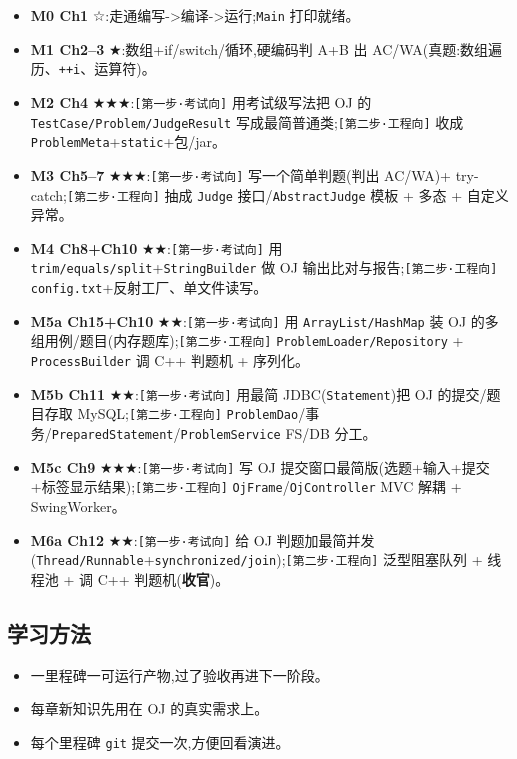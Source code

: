 \documentclass[
  11pt,
]{ctexart}
\providecommand{\tightlist}{%
  \setlength{\itemsep}{0pt}\setlength{\parskip}{0pt}}
\begin{document}
\begin{itemize}
\tightlist
\item
  \textbf{M0 Ch1}
  ☆:走通编写-\textgreater 编译-\textgreater 运行;\texttt{Main}
  打印就绪。
\item
  \textbf{M1 Ch2--3} ★:数组+if/switch/循环,硬编码判 A+B 出
  AC/WA(真题:数组遍历、\texttt{++i}、运算符)。
\item
  \textbf{M2 Ch4} ★★★:\texttt{{[}第一步·考试向{]}} 用考试级写法把 OJ 的
  \texttt{TestCase/Problem/JudgeResult}
  写成最简普通类;\texttt{{[}第二步·工程向{]}} 收成
  \texttt{ProblemMeta}+\texttt{static}+包/jar。
\item
  \textbf{M3 Ch5--7} ★★★:\texttt{{[}第一步·考试向{]}}
  写一个简单判题(判出 AC/WA)+ try-catch;\texttt{{[}第二步·工程向{]}}
  抽成 \texttt{Judge} 接口/\texttt{AbstractJudge} 模板 + 多态 +
  自定义异常。
\item
  \textbf{M4 Ch8+Ch10} ★★:\texttt{{[}第一步·考试向{]}} 用
  \texttt{trim/equals/split}+\texttt{StringBuilder} 做 OJ
  输出比对与报告;\texttt{{[}第二步·工程向{]}}
  \texttt{config.txt}+反射工厂、单文件读写。
\item
  \textbf{M5a Ch15+Ch10} ★★:\texttt{{[}第一步·考试向{]}} 用
  \texttt{ArrayList/HashMap} 装 OJ
  的多组用例/题目(内存题库);\texttt{{[}第二步·工程向{]}}
  \texttt{ProblemLoader/Repository} + \texttt{ProcessBuilder} 调 C++
  判题机 + 序列化。
\item
  \textbf{M5b Ch11} ★★:\texttt{{[}第一步·考试向{]}} 用最简
  JDBC(\texttt{Statement})把 OJ 的提交/题目存取
  MySQL;\texttt{{[}第二步·工程向{]}}
  \texttt{ProblemDao}/事务/\texttt{PreparedStatement}/\texttt{ProblemService}
  FS/DB 分工。
\item
  \textbf{M5c Ch9} ★★★:\texttt{{[}第一步·考试向{]}} 写 OJ
  提交窗口最简版(选题+输入+提交+标签显示结果);\texttt{{[}第二步·工程向{]}}
  \texttt{OjFrame}/\texttt{OjController} MVC 解耦 + SwingWorker。
\item
  \textbf{M6a Ch12} ★★:\texttt{{[}第一步·考试向{]}} 给 OJ
  判题加最简并发(\texttt{Thread/Runnable}+\texttt{synchronized/join});\texttt{{[}第二步·工程向{]}}
  泛型阻塞队列 + 线程池 + 调 C++ 判题机(\textbf{收官})。
\end{itemize}

\hypertarget{ux5b66ux4e60ux65b9ux6cd5}{%
\subsection{学习方法}\label{ux5b66ux4e60ux65b9ux6cd5}}

\begin{itemize}
\tightlist
\item
  一里程碑一可运行产物,过了验收再进下一阶段。
\item
  每章新知识先用在 OJ 的真实需求上。
\item
  每个里程碑 \texttt{git} 提交一次,方便回看演进。
\end{itemize}
\end{document}
